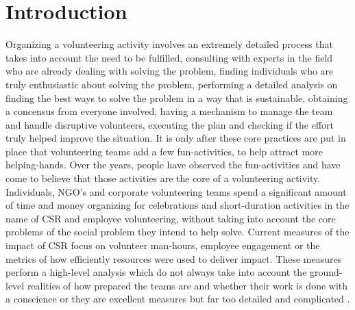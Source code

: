 \documentclass[conference]{IEEEtran}
\begin{document}
\section{Introduction}
Organizing a volunteering activity involves an extremely detailed process that takes into account the need to be fulfilled, consulting with experts in the field who are already dealing with solving the problem, finding individuals who are truly enthusiastic about solving the problem, performing a detailed analysis on finding the best ways to solve the problem in a way that is sustainable, obtaining a concensus from everyone involved, having a mechanism to manage the team and handle disruptive volunteers, executing the plan and checking if the effort truly helped improve the situation. It is only after these core practices are put in place that volunteering teams add a few fun-activities, to help attract more helping-hands. Over the years, people have observed the fun-activities and have come to believe that those activities are the core of a volunteering activity. Individuals, NGO's and corporate volunteering teams spend a significant amount of time and money organizing for celebrations and short-duration activities \cite{orphanageVisits1} in the name of CSR and employee volunteering, without taking into account the core problems of the social problem they intend to help solve.
Current measures of the impact of CSR focus on volunteer man-hours\cite{employeeVolunteerism}, employee engagement \cite{impactOnEmployees}\cite{intangibles} or the metrics of how efficiently resources were used to deliver impact\cite{classificationOfSocialImpact}\cite{businessCaseCSR}. These measures perform a high-level analysis which do not always take into account the ground-level realities of how prepared the teams are and whether their work is done with a conscience \cite{truthAboutCSR} or they are excellent measures but far too detailed and complicated \cite{detailedMeasure}.
\end{document}
